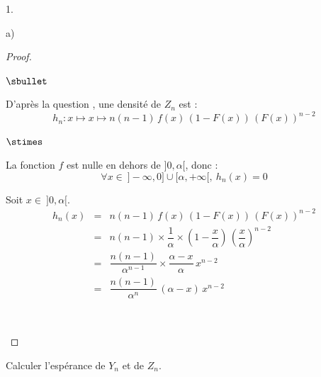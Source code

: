 \begin{noliste}{1.}
\begin{noliste}{a)}
\begin{proof}
\begin{noliste}{$\sbullet$}
	\conc{Finalement : $g_n : x \mapsto \left\{
	\begin{array}{cR{3cm}}
	  \dfrac{n}{\alpha^{n}} \, x^{n-1} & si $x \in \ ]0,\alpha[$
	  \nl
	  \nl[-.2cm]
	  0 & sinon
	\end{array}
	\right.$.}
	
	\item D'après la question , une densité de $Z_n$
	est :
	\[
	  h_n : x \mapsto x \mapsto n(n-1) \, f(x) \, (1-F(x)) \,
	  (F(x))^{n-2}
	\]
	\begin{noliste}{$\stimes$}
	  \item La fonction $f$ est nulle en dehors de $]0,\alpha[$, 
	  donc :
	  \[
	    \forall x \in \ ]-\infty, 0] \cup [\alpha, +\infty[, \
	    h_n(x)=0
	  \]
	  
	  
	  \newpage
	  
	  
	  \item Soit $x \in \ ]0,\alpha[$.
	  \[
	    \begin{array}{rcl}
	      h_n(x) & = & n(n-1) \, f(x) \, (1-F(x)) \, (F(x))^{n-2}
	      \\[.2cm]
	      & = & n(n-1) \times \dfrac{1}{\alpha} \times \left(1- 
	      \dfrac{x}{\alpha}
	      \right) \, \left( \dfrac{x}{\alpha}\right)^{n-2}
	      \\[.4cm]
	      & = & \dfrac{n(n-1)}{\alpha^{n-1}} \times 
	      \dfrac{\alpha - x}{\alpha} \, x^{n-2}
	      \\[.4cm]
	      & = & \dfrac{n(n-1)}{\alpha^{n}} \, (\alpha -x) \, 
	      x^{n-2}
	    \end{array}
	  \]
	\end{noliste}
	\conc{Finalement : $h_n : x \mapsto \left\{
	\begin{array}{cR{3cm}}
	  \dfrac{n(n-1)}{\alpha^{n}} \, (\alpha -x) \, x^{n-2}
	  & si $x \in \ ]0, \alpha[$
	  \nl
	  \nl[-.2cm]
	  0 & sinon
	\end{array}
	\right.$.}~\\[-1.4cm]
      \end{noliste}
    \end{proof}

    
    \item Calculer l'espérance de $Y_n$ et de $Z_n$.
  \end{noliste}
\end{noliste}
    
